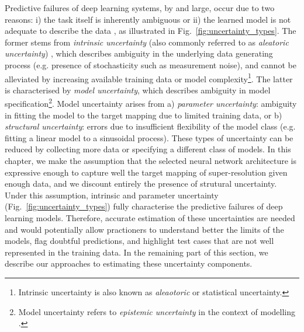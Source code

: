 Predictive failures of deep learning systems, by and large, occur due to two reasons: i) the task itself is inherently ambiguous or ii) the learned model is not adequate to describe the data  \cite{hora1996aleatory,der2009aleatory,tanno2017bayesian,kendall2017uncertainties}, as illustrated in Fig.~\ref{fig:uncertainty_types}. The former stems from \emph{intrinsic uncertainty} (also commonly referred to as \textit{aleatoric uncertainty}) \cite{wang1996intrinsic}, which describes ambiguity in the underlying data generating process  (e.g. presence of stochasticity such as measurement noise), and cannot be alleviated by increasing available training data or model complexity\footnote{Intrinsic uncertainty is also known as \textit{aleaotoric} or statistical uncertainty.}. The latter is characterised by \textit{model uncertainty}\cite{draper1995assessment}, which describes ambiguity in model specification\footnote{Model uncertainty refers to \textit{epistemic uncertainty} in the context of modelling \cite{hora1996aleatory}. }. Model uncertainty arises from a) \textit{parameter uncertainty}: ambiguity in fitting the model to the target mapping due to limited training data, or b) \textit{structural uncertainty}: errors due to insufficient flexibility of the model class (e.g. fitting a linear model to a sinusoidal process). These types of uncertainty can be reduced by collecting more data or specifying a different class of models. In this chapter, we make the assumption that the selected neural network architecture is expressive enough to capture well the target mapping of super-resolution given enough data, and we discount entirely the presence of strutural uncertainty. Under this assumption, intrinsic and parameter uncertainty (Fig.~\ref{fig:uncertainty_types}) fully characterise the predictive failures of deep learning models.  Therefore, accurate estimation of these uncertainties are needed and would potentially allow practioners to understand better the limits of the models, flag doubtful predictions, and highlight test cases that are not well represented in the training data. In the remaining part of this section, we describe our approaches to estimating these uncertainty components.



